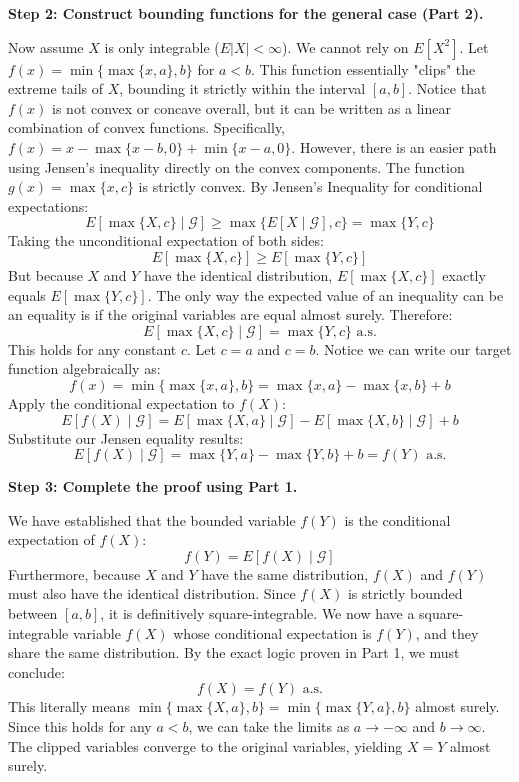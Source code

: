 \begin{solution}
\textbf{Step 2: Construct bounding functions for the general case (Part 2).}

Now assume $X$ is only integrable ($E|X| < \infty$). We cannot rely on $E[X^2]$.
Let $f(x) = \min\{\max\{x, a\}, b\}$ for $a < b$. This function essentially "clips" the extreme tails of $X$, bounding it strictly within the interval $[a, b]$.
Notice that $f(x)$ is not convex or concave overall, but it can be written as a linear combination of convex functions. Specifically, $f(x) = x - \max\{x - b, 0\} + \min\{x - a, 0\}$.
However, there is an easier path using Jensen's inequality directly on the convex components. The function $g(x) = \max\{x, c\}$ is strictly convex.
By Jensen's Inequality for conditional expectations:
\[ E[\max\{X, c\} \mid \mathcal{G}] \geq \max\{E[X \mid \mathcal{G}], c\} = \max\{Y, c\} \]
Taking the unconditional expectation of both sides:
\[ E[ \max\{X, c\} ] \geq E[ \max\{Y, c\} ] \]
But because $X$ and $Y$ have the identical distribution, $E[\max\{X, c\}]$ exactly equals $E[\max\{Y, c\}]$.
The only way the expected value of an inequality can be an equality is if the original variables are equal almost surely.
Therefore:
\[ E[\max\{X, c\} \mid \mathcal{G}] = \max\{Y, c\} \text{ a.s.} \]
This holds for any constant $c$. Let $c=a$ and $c=b$.
Notice we can write our target function algebraically as:
\[ f(x) = \min\{\max\{x, a\}, b\} = \max\{x, a\} - \max\{x, b\} + b \]
Apply the conditional expectation to $f(X)$:
\[ E[f(X) \mid \mathcal{G}] = E[\max\{X, a\} \mid \mathcal{G}] - E[\max\{X, b\} \mid \mathcal{G}] + b \]
Substitute our Jensen equality results:
\[ E[f(X) \mid \mathcal{G}] = \max\{Y, a\} - \max\{Y, b\} + b = f(Y) \text{ a.s.} \]

\textbf{Step 3: Complete the proof using Part 1.}

We have established that the bounded variable $f(Y)$ is the conditional expectation of $f(X)$:
\[ f(Y) = E[f(X) \mid \mathcal{G}] \]
Furthermore, because $X$ and $Y$ have the same distribution, $f(X)$ and $f(Y)$ must also have the identical distribution.
Since $f(X)$ is strictly bounded between $[a, b]$, it is definitively square-integrable.
We now have a square-integrable variable $f(X)$ whose conditional expectation is $f(Y)$, and they share the same distribution.
By the exact logic proven in Part 1, we must conclude:
\[ f(X) = f(Y) \text{ a.s.} \]
This literally means $\min\{\max\{X, a\}, b\} = \min\{\max\{Y, a\}, b\}$ almost surely.
Since this holds for any $a < b$, we can take the limits as $a \to -\infty$ and $b \to \infty$. The clipped variables converge to the original variables, yielding $X = Y$ almost surely.
\end{solution}

